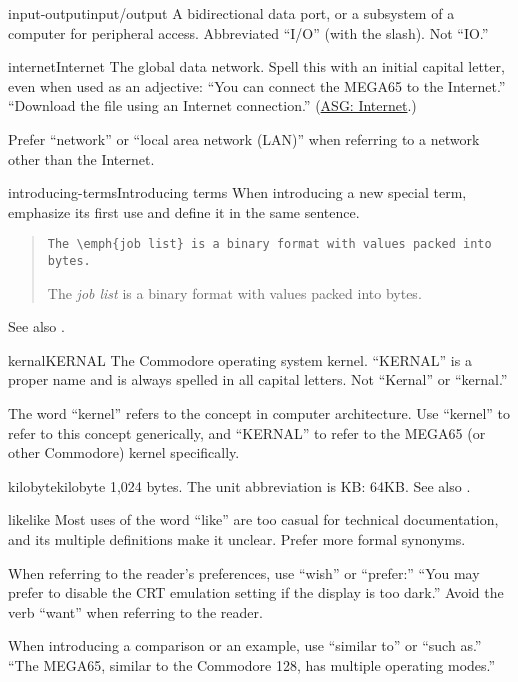 \begin{sgentry}{input-output}{input/output}
    A bidirectional data port, or a subsystem of a computer for peripheral access. Abbreviated ``I/O'' (with the slash). Not ``IO.''
\end{sgentry}

\begin{sgentry}{internet}{Internet}
    The global data network. Spell this with an initial capital letter, even when used as an adjective: ``You can connect the MEGA65 to the Internet.'' ``Download the file using an Internet connection.'' (\href{https://support.apple.com/en-my/guide/applestyleguide/apsg346ef241/web}{ASG: Internet}.)

    Prefer ``network'' or ``local area network (LAN)'' when referring to a network other than the Internet.
\end{sgentry}

\begin{sgentry}{introducing-terms}{Introducing terms}
    When introducing a new special term, emphasize its first use and define it in the same sentence.

    \begin{quote}
        \texttt{The {\textbackslash}emph\{job list\} is a binary format with values packed into bytes.}

        \hrulefill

        The \emph{job list} is a binary format with values packed into bytes.
    \end{quote}

    See also .
\end{sgentry}

\begin{sgentry}{kernal}{KERNAL}
    The Commodore operating system kernel. ``KERNAL'' is a proper name and is always spelled in all capital letters. Not ``Kernal'' or ``kernal.''

    The word ``kernel'' refers to the concept in computer architecture. Use ``kernel'' to refer to this concept generically, and ``KERNAL'' to refer to the MEGA65 (or other Commodore) kernel specifically.
\end{sgentry}

\begin{sgentry}{kilobyte}{kilobyte}
    1,024 bytes. The unit abbreviation is KB: 64KB. See also .
\end{sgentry}

\begin{sgentry}{like}{like}
    Most uses of the word ``like'' are too casual for technical documentation, and its multiple definitions make it unclear. Prefer more formal synonyms.

    When referring to the reader's preferences, use ``wish'' or ``prefer:'' ``You may prefer to disable the CRT emulation setting if the display is too dark.'' Avoid the verb ``want'' when referring to the reader.

    When introducing a comparison or an example, use ``similar to'' or ``such as.'' ``The MEGA65, similar to the Commodore 128, has multiple operating modes.''
\end{sgentry}

